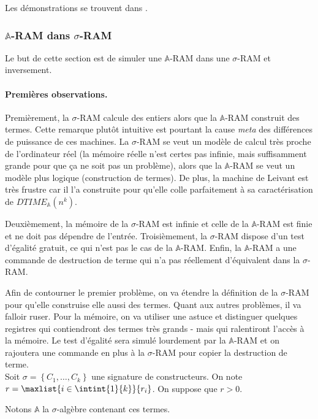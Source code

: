 \documentclass{article}
\newcommand{\bbA}{\mathbb{A}}
\begin{document}
			Les démonstrations se trouvent dans .

			
			\subsubsection{$\bbA$-RAM dans $\sigma$-RAM}


			Le but de cette section est de simuler une $\bbA$-RAM dans une $\sigma$-RAM et inversement.
			
			\paragraph{Premières observations.}
			Premièrement, la $\sigma$-RAM calcule des entiers alors que la $\bbA$-RAM construit des termes. Cette remarque plutôt intuitive est pourtant la cause \emph{meta} des différences de puissance de ces machines. La $\sigma$-RAM se veut un modèle de calcul très proche de l'ordinateur réel (la mémoire réelle n'est certes pas infinie, mais suffisamment grande pour que ça ne soit pas un problème), alors que la $\bbA$-RAM se veut un modèle plus logique (construction de termes). De plus, la machine de Leivant est très frustre car il l'a construite pour qu'elle colle parfaitement à sa caractérisation de $DTIME_{\bbA}(n^k)$.
			
			Deuxièmement, la mémoire de la $\sigma$-RAM est infinie et celle de la $\bbA$-RAM est finie et ne doit pas dépendre de l'entrée.
			Troisièmement, la $\sigma$-RAM dispose d'un test d'égalité gratuit, ce qui n'est pas le cas de la $\bbA$-RAM.
			Enfin, la $\bbA$-RAM a une commande de destruction de terme qui n'a pas réellement d'équivalent dans la $\sigma$-RAM. 
			
			Afin de contourner le premier problème, on va étendre la définition de la $\sigma$-RAM pour qu'elle construise elle aussi des termes. Quant aux autres problèmes, il va falloir ruser. Pour la mémoire, on va utiliser une astuce et distinguer quelques registres qui contiendront des termes très grands - mais qui ralentiront l'accès à la mémoire. Le test d'égalité sera simulé lourdement par la $\bbA$-RAM et on rajoutera une commande en plus à la $\sigma$-RAM pour copier la destruction de terme. 
			\\
			
			Soit $\sigma = \left\lbrace C_1, \dots, C_k \right\rbrace$ une signature de constructeurs. On note $r = \maxlist{i \in \intint{1}{k}}{r_i}$. On suppose que $r > 0$.
			
			Notons $\bbA$ la $\sigma$-algèbre contenant ces termes.
			
\end{document}
